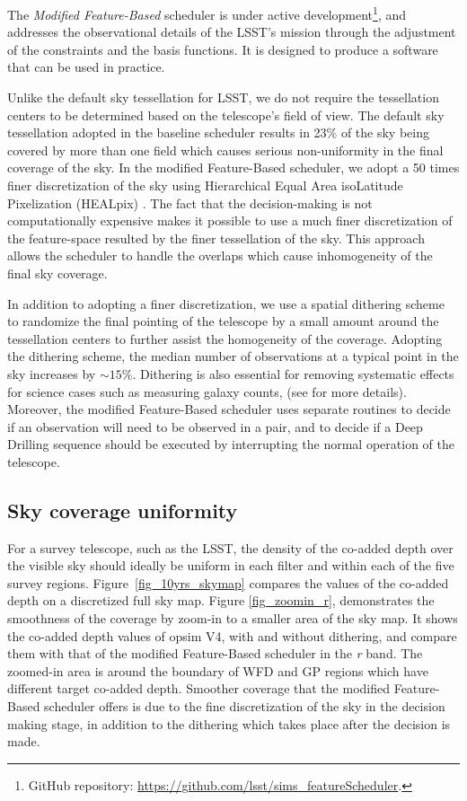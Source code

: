 \documentclass[12pt]{aastex62}
\theoremstyle{definition}
\begin{document}
The \textit{Modified Feature-Based} scheduler is under active development\footnote{GitHub repository: \url{https://github.com/lsst/sims_featureScheduler}.}, and addresses the observational details of the LSST's mission through the adjustment of the constraints and the basis functions. It is designed to produce a software that can be used in practice. 

Unlike the default sky tessellation for LSST, we do not require the tessellation centers to be determined based on the telescope's field of view. The default sky tessellation adopted in the baseline scheduler results in 23\% of the sky being covered by more than one field which causes serious non-uniformity in the final coverage of the sky. In the modified Feature-Based scheduler, we adopt a 50 times finer discretization of the sky using Hierarchical Equal Area isoLatitude Pixelization (HEALpix) \citep{gorski2005healpix}. The fact that the decision-making is not computationally expensive makes it possible to use a much finer discretization of the feature-space resulted by the finer tessellation of the sky. This approach allows the scheduler to handle the overlaps which cause inhomogeneity of the final sky coverage. 

In addition to adopting a finer discretization, we use a spatial dithering scheme to randomize the final pointing of the telescope by a small amount around the tessellation centers to further assist the homogeneity of the coverage. Adopting the dithering scheme, the median number of observations at a typical point in the sky increases by $\sim15$\%. Dithering is also essential for removing systematic effects for science cases such as measuring galaxy counts, (see \citep{Awan2016} for more details). Moreover, the modified Feature-Based scheduler uses separate routines to decide if an observation will need to be observed in a pair, and to decide if a Deep Drilling sequence should be executed by interrupting the normal operation of the telescope.

\subsection{Sky coverage uniformity}
For a survey telescope, such as the LSST, the density of the co-added depth over the visible sky should ideally be uniform in each filter and within each of the five survey regions. Figure~\ref{fig_10yrs_skymap} compares the values of the co-added depth on a discretized full sky map. Figure \ref{fig_zoomin_r}, demonstrates the smoothness of the coverage by zoom-in to a smaller area of the sky map. It shows the co-added depth values of opsim V4, with and without dithering, and compare them with that of the modified Feature-Based scheduler in the \textit{r} band. The zoomed-in area is around the boundary of WFD and GP regions which have different target co-added depth. Smoother coverage that the modified Feature-Based scheduler offers is due to the fine discretization of the sky in the decision making stage, in addition to the dithering which takes place after the decision is made.
\end{document}
